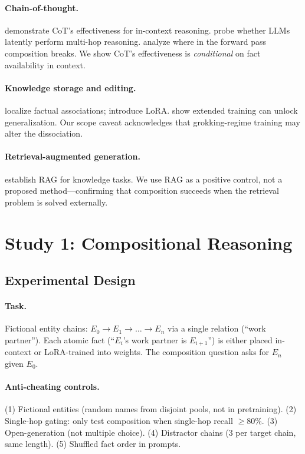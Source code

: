 \documentclass[11pt]{article}
\begin{document}
\paragraph{Chain-of-thought.} \citet{wei2022cot} demonstrate CoT's effectiveness for in-context reasoning. \citet{yang2024latent} probe whether LLMs latently perform multi-hop reasoning. \citet{biran2024hopping} analyze where in the forward pass composition breaks. We show CoT's effectiveness is \emph{conditional} on fact availability in context.

\paragraph{Knowledge storage and editing.} \citet{meng2022rome} localize factual associations; \citet{hu2022lora} introduce LoRA. \citet{power2022grokking} show extended training can unlock generalization. Our scope caveat acknowledges that grokking-regime training may alter the dissociation.

\paragraph{Retrieval-augmented generation.} \citet{lewis2020rag} establish RAG for knowledge tasks. We use RAG as a positive control, not a proposed method---confirming that composition succeeds when the retrieval problem is solved externally.

\section{Study 1: Compositional Reasoning}

\subsection{Experimental Design}

\paragraph{Task.} Fictional entity chains: $E_0 \rightarrow E_1 \rightarrow \ldots \rightarrow E_n$ via a single relation (``work partner''). Each atomic fact (``$E_i$'s work partner is $E_{i+1}$'') is either placed in-context or LoRA-trained into weights. The composition question asks for $E_n$ given $E_0$.

\paragraph{Anti-cheating controls.}
(1) Fictional entities (random names from disjoint pools, not in pretraining).
(2) Single-hop gating: only test composition when single-hop recall $\geq$80\%.
(3) Open-generation (not multiple choice).
(4) Distractor chains (3 per target chain, same length).
(5) Shuffled fact order in prompts.
\end{document}
